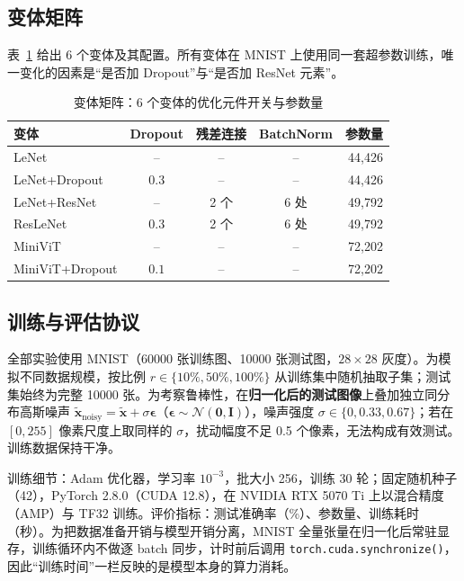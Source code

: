\documentclass[12pt,hyperref,a4paper,UTF8]{ctexart}
\begin{document}
\subsection{变体矩阵}
表~\ref{tab:variants} 给出 6 个变体及其配置。所有变体在 MNIST 上使用同一套超参数训练，唯一变化的因素是“是否加 Dropout”与“是否加 ResNet 元素”。

\begin{table}[!htbp]
    \centering
    \begin{tabular}{l c c c r}
    \hline
    变体 & Dropout & 残差连接 & BatchNorm & 参数量 \\
    \hline
    LeNet            & --         & -- & -- & 44{,}426 \\
    LeNet+Dropout    & $0.3$      & -- & -- & 44{,}426 \\
    LeNet+ResNet     & --         & 2 个 & 6 处 & 49{,}792 \\
    ResLeNet         & $0.3$      & 2 个 & 6 处 & 49{,}792 \\
    MiniViT          & --         & -- & -- & 72{,}202 \\
    MiniViT+Dropout  & $0.1$      & -- & -- & 72{,}202 \\
    \hline
    \end{tabular}
    \caption{变体矩阵：6 个变体的优化元件开关与参数量}
    \label{tab:variants}
\end{table}

\subsection{训练与评估协议}
全部实验使用 MNIST\cite{lecun1998gradient}（60000 张训练图、10000 张测试图，$28\times28$ 灰度）。为模拟不同数据规模，按比例 $r\in\{10\%,50\%,100\%\}$ 从训练集中随机抽取子集；测试集始终为完整 10000 张。为考察鲁棒性，在\textbf{归一化后的测试图像}上叠加独立同分布高斯噪声 $\tilde{\bm{x}}_{\mathrm{noisy}}=\tilde{\bm{x}}+\sigma\bm{\epsilon}$（$\bm{\epsilon}\sim\mathcal{N}(\bm{0},\bm{I})$），噪声强度 $\sigma\in\{0,0.33,0.67\}$；若在 $[0,255]$ 像素尺度上取同样的 $\sigma$，扰动幅度不足 0.5 个像素，无法构成有效测试。训练数据保持干净。

训练细节：Adam 优化器，学习率 $10^{-3}$，批大小 256，训练 30 轮；固定随机种子（42），PyTorch 2.8.0（CUDA 12.8），在 NVIDIA RTX 5070 Ti 上以混合精度（AMP）与 TF32 训练。评价指标：测试准确率（\%）、参数量、训练耗时（秒）。为把数据准备开销与模型开销分离，MNIST 全量张量在归一化后常驻显存，训练循环内不做逐 batch 同步，计时前后调用 \texttt{torch.cuda.synchronize()}，因此“训练时间”一栏反映的是模型本身的算力消耗。
\end{document}
